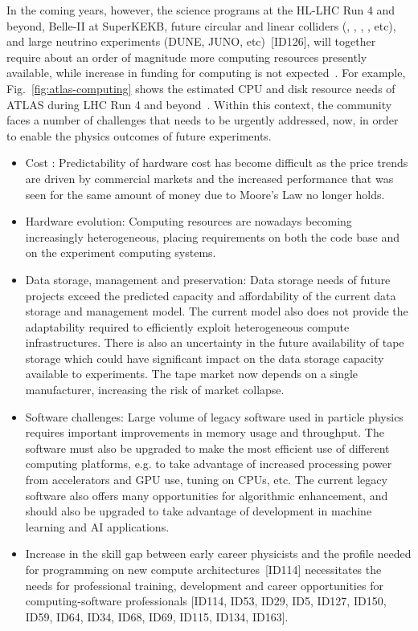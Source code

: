 In the coming years, however, the science programs at the HL-LHC Run 4 and beyond, Belle-II at SuperKEKB, future circular and linear colliders (\FCC, \CEPC, \ILC, \CLIC, etc), and large neutrino experiments (DUNE, JUNO, etc)~[ID126], will together require about an order of magnitude more %
computing resources presently available, while increase in funding for computing is not expected~\cite{bib:MK-talk}.  For example, Fig.~\ref{fig:atlas-computing} shows the estimated CPU and disk resource needs of ATLAS during LHC Run 4 and beyond~\cite{bib:atlas-computing}.  Within this context, the community faces a number of challenges that needs to be urgently addressed, now, in order to enable the physics outcomes of future experiments. 
\begin{itemize}
\item Cost : Predictability of hardware cost has become difficult as the price trends are driven by commercial markets and the increased performance that was seen for the same amount of money due to Moore's Law no longer holds.  
\item Hardware evolution: Computing resources are nowadays becoming increasingly heterogeneous, placing requirements on both the code base and on the experiment computing systems.
\item Data storage, management and preservation: Data storage needs of future projects exceed the predicted capacity and affordability of the current data storage and management model.  The current model also does not provide the adaptability required to efficiently exploit heterogeneous compute infrastructures. 
There is also an uncertainty in the future availability of tape storage which could have significant impact on the data storage capacity available to experiments.  The tape market now depends on a single manufacturer, increasing the risk of market collapse.

\item Software challenges: Large volume of legacy software used in particle physics requires important improvements in memory usage and throughput.  The software must also be upgraded to make the most efficient use of different computing platforms, e.g. to take advantage of increased processing power from accelerators and GPU use, tuning on CPUs, etc. The current legacy software also offers many opportunities for algorithmic enhancement, and should also be upgraded to take advantage of development in machine learning and AI applications.
\item Increase in the skill gap between early career physicists and the profile needed for programming on new compute architectures~[ID114] necessitates the needs for professional training, development and career opportunities for computing-software professionals [ID114, ID53, ID29, ID5, ID127, ID150, ID59, ID64, ID34, ID68, ID69, ID115, ID134, ID163].


\end{itemize}
